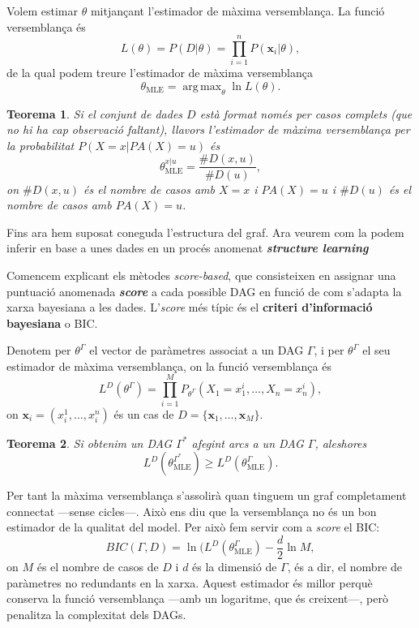 \documentclass{article}
\newtheorem{teorema}{Teorema}
\theoremstyle{definition}
\DeclareMathOperator*{\argmax}{arg\,max}
\begin{document}
Volem estimar $\theta$ mitjan\c{c}ant l'estimador de m\`{a}xima versemblan\c{c}a. La funci\'{o} versemblan\c{c}a \'{e}s
\[L(\theta)=P(D|\theta)=\prod_{i=1}^nP(\boldsymbol{x}_i|\theta),\]
de la qual podem treure l'estimador de m\`{a}xima versemblan\c{c}a
\[\theta_{\text{MLE}}=\argmax_{\theta}\ln L(\theta).\]

\begin{teorema}
Si el conjunt de dades $D$ est\`{a} format nom\'{e}s per casos complets (que no hi ha cap observaci\'{o} faltant), llavors l'estimador de m\`{a}xima versemblan\c{c}a per la probabilitat $P(X=x|PA(X)=u)$ \'{e}s
\[\theta_{\text{MLE}}^{x|u}=\frac{\#D(x,u)}{\#D(u)},\]
on $\#D(x,u)$ \'{e}s el nombre de casos amb $X=x$ i $PA(X)=u$ i $\#D(u)$ \'{e}s el nombre de casos amb $PA(X)=u$.
\end{teorema}

Fins ara hem suposat coneguda l'estructura del graf. Ara veurem com la podem inferir en base a unes dades en un proc\'{e}s anomenat \textbf{\emph{structure learning}}

Comencem explicant els m\`{e}todes \emph{score-based}, que consisteixen en assignar una puntuaci\'{o} anomenada \textbf{\emph{score}} a cada possible DAG en funci\'{o} de com s'adapta la xarxa bayesiana a les dades. L'\emph{score} m\'{e}s t\'{i}pic \'{e}s el \textbf{criteri d'informaci\'{o} bayesiana} o BIC.

Denotem per $\theta^{\Gamma}$ el vector de
par\`{a}metres associat a un DAG $\Gamma$, i per $\theta^{\Gamma}$ el seu estimador de m\`{a}xima versemblan\c{c}a, on la funci\'{o} versemblan\c{c}a \'{e}s
\[L^D(\theta^{\Gamma})=\prod_{i=1}^MP_{\theta^{\Gamma}}(X_1=x_1^i,\ldots,X_n=x_n^i),\]
on $\boldsymbol{x}_i=(x_i^1,\ldots,x_i^n)$ \'{e}s un cas de $D=\{\boldsymbol{x}_1,\ldots,\boldsymbol{x}_M\}$.

\begin{teorema}
Si obtenim un DAG $\Gamma^*$ afegint arcs a un DAG $\Gamma$, aleshores
\[L^D(\theta^{\Gamma^*}_{\text{MLE}})\geq L^D(\theta^{\Gamma}_{\text{MLE}}).\]
\end{teorema}

Per tant la m\`{a}xima versemblan\c{c}a s'assolir\`{a} quan tinguem un graf completament connectat ---sense cicles---. Aix\`{o} ens diu que la versemblan\c{c}a no \'{e}s un bon estimador de la qualitat del model. Per aix\`{o} fem servir com a \emph{score} el BIC:
\[BIC(\Gamma,D)=\ln(L^D(\theta^{\Gamma}_{\text{MLE}})-\frac{d}{2}\ln M,\]
on $M$ \'{e}s el nombre de casos de $D$ i $d$ \'{e}s la dimensi\'{o} de $\Gamma$, \'{e}s a dir, el nombre de par\`{a}metres no redundants en la xarxa. Aquest estimador \'{e}s millor perqu\`{e} conserva la funci\'{o} versemblan\c{c}a ---amb un logaritme, que \'{e}s creixent---, per\`{o} penalitza la complexitat dels DAGs.
\end{document}
